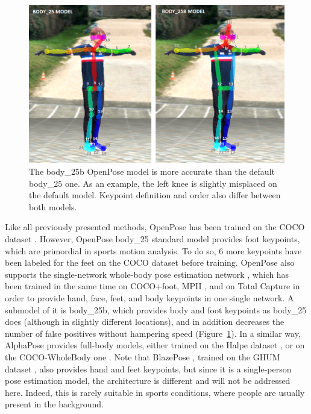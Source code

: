 \begin{figure}[hbtp]
	\centering
	\def\svgwidth{1\columnwidth}
	\fontsize{10pt}{10pt}\selectfont
	\includegraphics[width=1\linewidth]{"../Chap2/Figures/Fig_body25b.png"}
	\caption{The body\_25b OpenPose model is more accurate than the default body\_25 one. As an example, the left knee is slightly misplaced on the default model. Keypoint definition and order also differ between both models.} 
	\label{fig_body25b}
\end{figure}

Like all previously presented methods, OpenPose has been trained on the COCO dataset \cite{Lin2014}. However, OpenPose body\_25 standard model provides foot keypoints, which are primordial in sports motion analysis. To do so, 6 more keypoints have been labeled for the feet on the COCO dataset before training. OpenPose also supports the single-network whole-body pose estimation network \cite{Hidalgo2019}, which has been trained in the same time on COCO+foot,  MPII \cite{Andriluka2014}, and on Total Capture \cite{Xiang2019} in order to provide hand, face, feet, and body keypoints in one single network. A submodel of it is body\_25b, which provides body and foot keypoints as body\_25 does (although in slightly different locations), and in addition decreases the number of false positives without hampering speed (Figure~\ref{fig_body25b}). In a similar way, AlphaPose provides full-body models, either trained on the Halpe dataset \cite{Li2020}, or on the COCO-WholeBody one \cite{Xu2022}. Note that BlazePose \cite{Bazarevsky2020}, trained on the GHUM dataset \cite{Xu2020b}, also provides hand and feet keypoints, but since it is a single-person pose estimation model, the architecture is different and will not be addressed here. Indeed, this is rarely suitable in sports conditions, where people are usually present in the background. 


